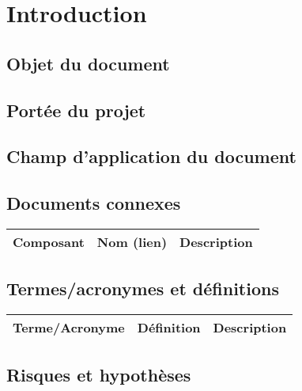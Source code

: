 \documentclass[a4paper,12pt]{report}  %
\begin{document}
	
		
	\tableofcontents
	\pagebreak
	
	
	
	\section{Introduction}
	
	\subsection{Objet du document}
	
	\subsection{Portée du projet}
	
	\subsection{Champ d'application du document}
	
	\subsection{Documents connexes}
	\begin{longtable}{|l|l|l|}
		\hline
		\textbf{Composant} & \textbf{Nom (lien)} & \textbf{Description} \\
		\hline
	\end{longtable}
	
	\subsection{Termes/acronymes et définitions}
	\begin{longtable}{|l|l|l|}
		\hline
		\textbf{Terme/Acronyme} & \textbf{Définition} & \textbf{Description} \\
		\hline
	\end{longtable}
	
	\subsection{Risques et hypothèses}
	
\end{document}
